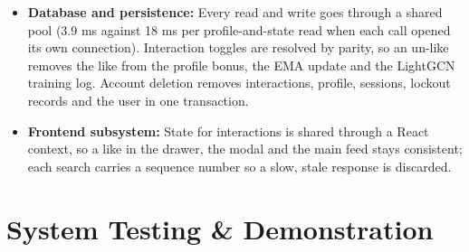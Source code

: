 \documentclass[11pt, a4paper]{article}
\begin{document}
\begin{itemize}[noitemsep, topsep=2pt]
    \item \textbf{Database and persistence:} Every read and write goes through a shared pool (3.9 ms against 18 ms per profile-and-state read when each call opened its own connection). Interaction toggles are resolved by parity, so an un-like removes the like from the profile bonus, the EMA update and the LightGCN training log. Account deletion removes interactions, profile, sessions, lockout records and the user in one transaction.
    \item \textbf{Frontend subsystem:} State for interactions is shared through a React context, so a like in the drawer, the modal and the main feed stays consistent; each search carries a sequence number so a slow, stale response is discarded.
\end{itemize}

\section{System Testing \& Demonstration}
\end{document}
